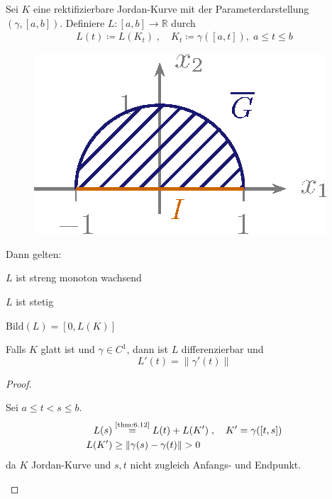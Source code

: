 \documentclass[a4paper,10pt]{scrbook}
\begin{document}
\begin{theorem}[Hilfssatz] \label{thm:6.14}
  Sei $K$ eine rektifizierbare Jordan-Kurve mit der Parameterdarstellung $(\gamma,[a,b])$. Definiere $L : [a,b] \to \mathbb{R}$ durch
  \begin{align*}
    L(t) \coloneq L(K_t) \; , \quad K_t \coloneq \gamma([a,t]) , \; a \leq t \leq b
  \end{align*}
  \begin{figure}[H]
    \centering
    \includegraphics[scale=0.2]{images/ana3-tmp-55}
  \end{figure}
  Dann gelten:
  \begin{enum-arab}
    \item $L$ ist streng monoton wachsend

    \item $L$ ist stetig

    \item $\mathrm{Bild}(L) = [0,L(K)]$

    \item Falls $K$ glatt ist und $\gamma \in C^1$, dann ist $L$ differenzierbar und \[L'(t) = \|\gamma'(t)\|\]
  \end{enum-arab}

  \begin{proof}
    \begin{enum-arab}
      \item \label{itm:6.14 1)} Sei $a \leq t < s \leq b$.
      \begin{align*}
        L(s) &\overset{\text{\ref{thm:6.12}}}{=} L(t) + L(K') \; , \quad K' = \gamma([t,s]) \\
        L(K') &\geq \|\gamma(s) - \gamma(t)\| > 0
      \end{align*}
      da $K$ Jordan-Kurve und $s,t$ nicht zugleich Anfangs- und Endpunkt.


\end{enum-arab}
\end{proof}
\end{theorem}
\end{document}
